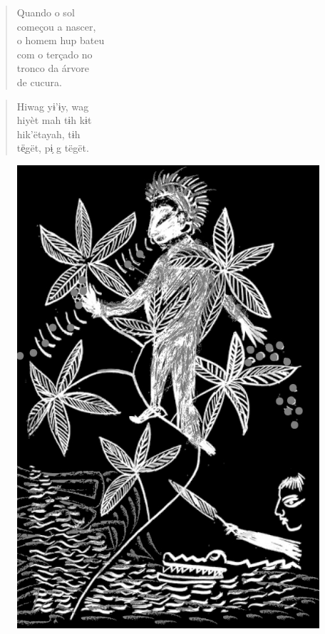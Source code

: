 \mbox{}\vspace*{\fill}

\begin{verse}
Quando o sol\\
começou a nascer,\\
o homem hup bateu\\
com o terçado no\\
tronco da árvore\\
de cucura.
\end{verse}

\begin{verse}
Hiwag yɨ’ɨy, wag\\
hiyèt mah tɨh kɨt\\
hik’ëtayah, tɨh\\
të̖gët, pɨ̗ g tëgët.
\end{verse}

\vspace*{\fill}

\begin{figure}
\vspace*{-1.5cm}
\hspace*{-2.4cm}\includegraphics[width=142mm]{./imgs/img5.jpg}
\end{figure}

